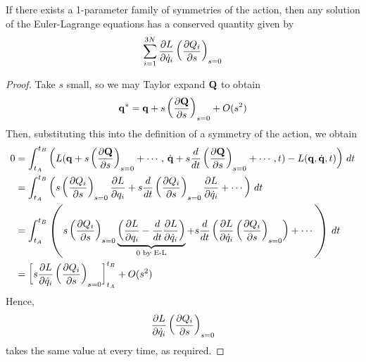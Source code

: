 \documentclass{../template/note}
\begin{document}
    \begin{theorem}
        If there exists a 1-parameter family of symmetries of the action, then any solution of the Euler-Lagrange equations has a conserved quantity given by
        \begin{align*}
            \sum_{i=1}^{3N} \pd{L}{\dot q_i} \left(\pd{Q_i}{s}\right)_{s=0}
        \end{align*}
    \end{theorem}
    
    \begin{proof}
        Take $s$ small, so we may Taylor expand $\V Q$ to obtain
        \begin{align*}
            \V q^* = \V q + s\left(\pd{\V Q}{s}\right)_{s=0} + O(s^2)
        \end{align*}
        Then, substituting this into the definition of a symmetry of the action, we obtain
        \begin{align*}
            0 & = \int_{t_A}^{t_B} \left(L(\V q + s \left(\pd{\V Q}{s}\right)_{s=0} + \cdots,\, \dot{\V q} + s \frac{d}{dt}\left(\pd{\V Q}{s}\right)_{s=0} + \cdots, t) - L(\V q, \dot{\V q}, t)\right) \D t \\
            &= \int_{t_A}^{t_B} \left(s \left(\pd{Q_i}{s}\right)_{s=0} \pd{L}{q_i} + s \frac{d}{dt} \left(\pd{Q_i}{s}\right)_{s=0} \pd{L}{\dot q_i} + \cdots\right) \D t \\
            &= \int_{t_A}^{t_B} \left(s \left(\pd{Q_i}{s}\right)_{s=0} \underbrace{\left(\pd{L}{q_i} - \frac{d}{dt} \pd{L}{\dot q_i}\right)}_{0 \text{ by E-L}} + s \frac{d}{dt} \left( \pd{L}{\dot q_i} \left(\pd{Q_i}{s}\right)_{s=0} \right) + \cdots\right) \D t \\
            &= \left[s \pd{L}{\dot q_i} \left(\pd{Q_i}{s}\right)_{s=0}\right]_{t_A}^{t_B} + O(s^2)
        \end{align*}
        Hence,
        \begin{align*}
            \pd{L}{\dot q_i} \left(\pd{Q_i}{s}\right)_{s=0}
        \end{align*}
        takes the same value at every time, as required.  
    \end{proof}
    
\end{document}
